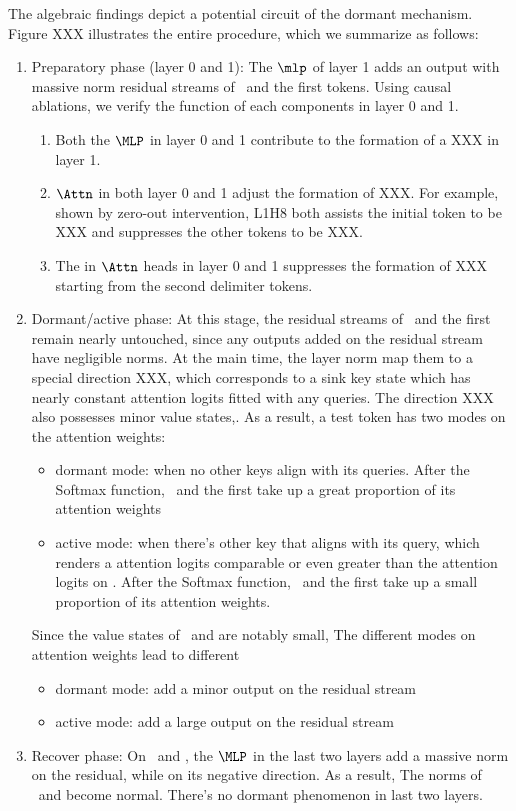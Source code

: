 The algebraic findings depict a potential circuit of the dormant mechanism. Figure XXX illustrates the entire procedure, which we summarize as follows:
\begin{enumerate}
    \item Preparatory phase (layer 0 and 1): The $\mlp$ of layer 1 adds an output with massive norm residual streams of \bos~and the first \delim tokens. Using causal ablations, we verify the function of each components in layer 0 and 1.
    \begin{enumerate}
        \item {} Both the $\MLP$ in layer 0 and 1 contribute to the formation of a XXX in layer 1.
        \item $\Attn$ in both layer 0 and 1 adjust the formation of XXX. For example, shown by zero-out intervention, L1H8 both assists the initial token to be XXX and suppresses the other tokens to be XXX.
        \item The \rope in $\Attn$ heads in layer 0 and 1 suppresses the formation of XXX starting from the second delimiter tokens.
    \end{enumerate}
    \item Dormant/active phase: At this stage, the residual streams of \bos~and the first \delim remain nearly untouched, since any outputs added on the residual stream have negligible norms. At the main time, the layer norm map them to a special direction XXX, which corresponds to a sink key state which has nearly constant attention logits fitted with any queries. The direction XXX also possesses minor value states,. As a result, a test token has two modes on the attention weights:
    \begin{itemize}
        \item dormant mode: when no other keys align with its queries. After the Softmax function, \bos~and the first \delim take up a great proportion of its attention weights
        \item active mode: when there's other key that aligns with its query, which renders a attention logits comparable or even greater than the attention logits on \bos. After the Softmax function, \bos~and the first \delim take up a small proportion of its attention weights.
    \end{itemize}
    Since the value states of \bos~and \delim are notably small,
    The different modes on attention weights lead to different     \begin{itemize}
        \item dormant mode: add a minor output on the residual stream
        \item active mode: add a large output on the residual stream
    \end{itemize}
\item Recover phase: On \bos~and \delim, the $\MLP$ in the last two layers add a massive norm on the residual, while on its negative direction. As a result, The norms of \bos~and \delim become normal. There's no dormant phenomenon in last two layers.
\end{enumerate}


